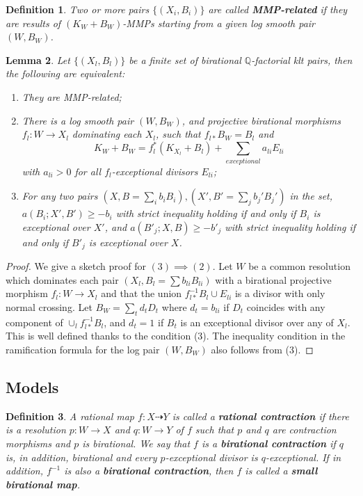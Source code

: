 \documentclass[11pt]{amsart}
\newtheorem{defn}{Definition}[section]
\newtheorem{lem}[defn]{Lemma}
\begin{document}
\begin{defn}
  \cite[Definition 3.3]{brunoLogSarkisovProgram1995}
  Two or more pairs $ \{(X_i,B_i)\} $ are called \textbf{MMP-related} if they are results of $ (K_W+B_W) $-MMPs starting from a given log smooth pair $(W,B_{W})$.
\end{defn}
\begin{lem}\label{MMPrelatedConditation}
  \cite[Proposition 3.4]{brunoLogSarkisovProgram1995}
  Let $ \{(X_l,B_l)\} $ be a finite set of birational $ \mathbb{Q} $-factorial klt pairs, then the following are equivalent:
  \begin{enumerate}
    \item They are MMP-related;
    \item There is a log smooth pair $ (W,B_W) $, and projective birational morphisms $ f_l:W\to  X_l $ dominating each $ X_l $, such that $ f_{l*}B_W=B_l $ and
          \[ K_W+B_W=f_l^*(K_{X_l}+B_l)+\sum_{exceptional}{a_{li}E_{li}} \]
          with $ a_{li}>0 $ for all $ f_l $-exceptional divisors $E_{li}$;
    \item For any two pairs $ (X,B=\sum_ib_{i }B_i),(X',B'=\sum_{j}b_{j}'B_{j}') $ in the set,  $ a(B_i;X',B')\geqslant -b_i $ with strict inequality holding if and only if $ B_i $ is exceptional over $ X' $, and $ a(B'_j;X,B)\geqslant -b'_j $ with strict inequality holding if and only if $ B'_j $ is exceptional over $ X $.
  \end{enumerate}
\end{lem}
\begin{proof}
  We give a sketch proof for $(3) \implies (2)$. Let $W$ be a common resolution which dominates each pair $(X_l,B_l=\sum b_{li}B_{li})$ with a birational projective morphism $f_l:W\to X_l$ and that the union $f_{l*}^{-1}B_l\cup E_{li}$ is a divisor with only normal crossing. Let $B_W=\sum_t d_tD_t $ where $d_t = b_{li}$ if $D_t$ coincides with any component of $\cup_l f_{l*}^{-1}B_l$, and $d_t=1$ if $B_t$ is an exceptional divisor over any of $X_l$. This is well defined thanks to the condition (3). The inequality condition in the ramification formula for the log pair $(W,B_W)$ also follows from (3).
\end{proof}

\subsection{Models}
\begin{defn}
  \cite[\S 2]{haconSarkisovProgram2012} A rational map $f:X\dashrightarrow Y$ is called a \textbf{rational contraction} if there is a resolution $p:W\to X$  and $q:W\to Y$  of $f$  such that $p$  and $q$  are contraction morphisms and $p$  is birational. We say that $f$ is a \textbf{birational contraction} if $q$  is, in addition, birational and every $p$-exceptional divisor is $q$-exceptional. If in addition, $f^{-1}$ is also a \textbf{birational contraction}, then $f$ is called a \textbf{small birational map}.
\end{defn}
\end{document}
